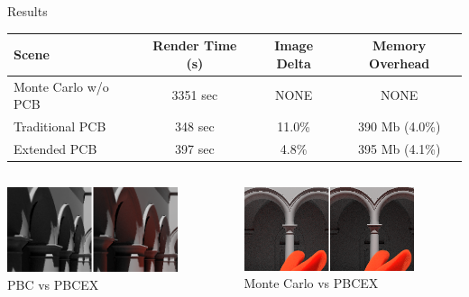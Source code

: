 \documentclass[10pt,compress,professionalfont]{beamer}
\begin{document}
\begin{frame}{Results}

    \begin{center}
    \setlength{\tabcolsep}{2pt}
    \begin{tabular}{ | l | c | c | c | }
      \hline                       
      Scene & Render Time (s) & Image Delta & Memory Overhead \\
      \hline                  
      Monte Carlo w/o PCB & 3351 sec & NONE & NONE \\
      Traditional PCB & 348 sec & 11.0\% & 390 Mb (4.0\%) \\
      Extended PCB & 397 sec & 4.8\% & 395 Mb (4.1\%)  \\
      \hline  
    \end{tabular}
    \end{center}


    \begin{columns}
        \begin{column}{0.5\textwidth}

            {\centering
            \includegraphics[width=50mm]{../img/compare_trad_corrected}\\
            {\centering\scriptsize PBC vs PBCEX\\}
            }

        \end{column}
        \begin{column}{0.5\textwidth}
            {\centering
            \includegraphics[width=50mm]{../img/compare1_corrected}\\
            {\centering\scriptsize Monte Carlo vs PBCEX\\}
            }
        \end{column}
    \end{columns}


\end{frame}
\end{document}

